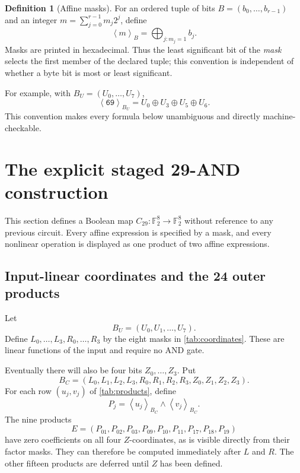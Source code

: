 \documentclass[11pt]{article}
\theoremstyle{definition}
\newtheorem{definition}[definition]{Definition}
\newcommand{\F}{\mathbb F}
\newcommand{\mask}[2]{\left\langle #1\right\rangle_{#2}}
\begin{document}
\begin{definition}[Affine masks]
\label{def:masks}
For an ordered tuple of bits \(B=(b_0,\ldots,b_{r-1})\) and an integer
\(m=\sum_{j=0}^{r-1}m_j2^j\), define
\begin{equation}
  \mask{m}{B}=\bigoplus_{j:m_j=1}b_j.
  \label{eq:mask}
\end{equation}
Masks are printed in hexadecimal.  Thus the least significant bit of the \emph{mask} selects the
first member of the declared tuple; this convention is independent of whether a byte bit is most or
least significant.
\end{definition}

For example, with \(B_U=(U_0,\ldots,U_7)\),
\[
 \mask{\mathtt{69}}{B_U}=U_0\oplus U_3\oplus U_5\oplus U_6.
\]
This convention makes every formula below unambiguous and directly machine-checkable.

\section{The explicit staged 29-AND construction}
\label{sec:construction}

This section defines a Boolean map \(C_{29}:\F_2^8\to\F_2^8\) without reference to any previous
circuit.  Every affine expression is specified by a mask, and every nonlinear operation is displayed
as one product of two affine expressions.

\subsection{Input-linear coordinates and the 24 outer products}

Let
\[
 B_U=(U_0,U_1,\ldots,U_7).
\]
Define \(L_0,\ldots,L_3,R_0,\ldots,R_3\) by the eight masks in
\cref{tab:coordinates}.  These are linear functions of the input and require no AND gate.

Eventually there will also be four bits \(Z_0,\ldots,Z_3\).  Put
\begin{equation}
 B_C=(L_0,L_1,L_2,L_3,R_0,R_1,R_2,R_3,Z_0,Z_1,Z_2,Z_3).
 \label{eq:coordinate-basis}
\end{equation}
For each row \((u_j,v_j)\) of \cref{tab:products}, define
\begin{equation}
  P_j=\mask{u_j}{B_C}\wedge\mask{v_j}{B_C}.
  \label{eq:outer-products}
\end{equation}
The nine products
\begin{equation}
 E=(P_{01},P_{02},P_{03},P_{09},P_{10},P_{11},P_{17},P_{18},P_{19})
 \label{eq:early-products}
\end{equation}
have zero coefficients on all four \(Z\)-coordinates, as is visible directly from their factor
masks.  They can therefore be computed immediately after \(L\) and \(R\).  The other fifteen
products are deferred until \(Z\) has been defined.
\end{document}
